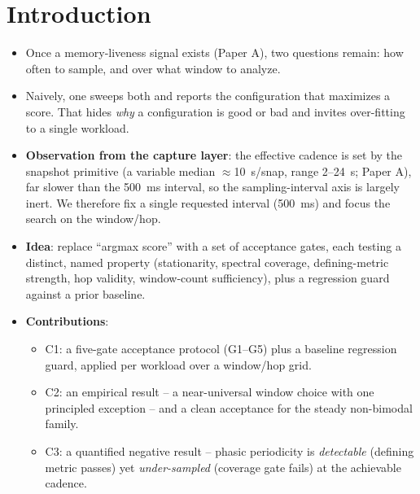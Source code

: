 \documentclass[conference]{IEEEtran}
\begin{document}
\section{Introduction}
\begin{itemize}
  \item Once a memory-liveness signal exists (Paper A), two questions remain:
        how often to sample, and over what window to analyze.
  \item Naively, one sweeps both and reports the configuration that maximizes a
        score. That hides \emph{why} a configuration is good or bad and invites
        over-fitting to a single workload.
  \item \textbf{Observation from the capture layer}: the effective cadence is
        set by the snapshot primitive (a variable median
        $\approx$\SI{10}{\second}/snap, range \SI{2}{}--\SI{24}{\second}; Paper
        A), far slower than the \SI{500}{\milli\second} interval, so the
        sampling-interval axis is largely inert. We therefore fix a single
        requested interval (\SI{500}{\milli\second}) and focus the search on the
        window/hop.
  \item \textbf{Idea}: replace ``argmax score'' with a set of acceptance gates,
        each testing a distinct, named property (stationarity, spectral
        coverage, defining-metric strength, hop validity, window-count
        sufficiency), plus a regression guard against a prior baseline.
  \item \textbf{Contributions}:
    \begin{itemize}
      \item C1: a five-gate acceptance protocol (G1--G5) plus a baseline
            regression guard, applied per workload over a window/hop grid.
      \item C2: an empirical result -- a near-universal window choice with one
            principled exception -- and a clean acceptance for the steady
            non-bimodal family.
      \item C3: a quantified negative result -- phasic periodicity is
            \emph{detectable} (defining metric passes) yet \emph{under-sampled}
            (coverage gate fails) at the achievable cadence.
    \end{itemize}
\end{itemize}
\end{document}
